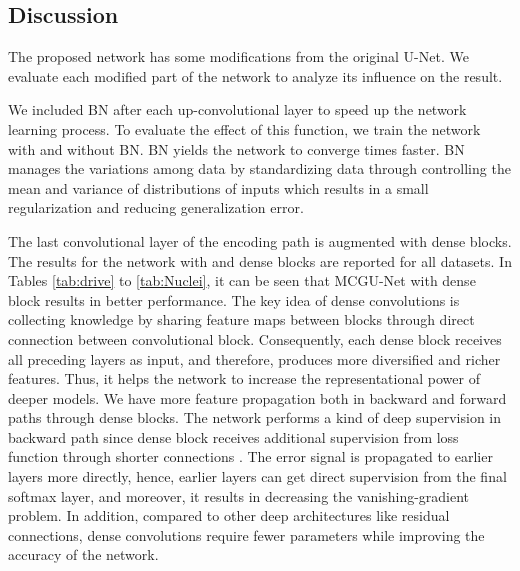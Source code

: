 \documentclass[journal]{IEEEtran}
\begin{document}
\subsection{Discussion}
The proposed network has some modifications from the original U-Net. We evaluate each modified part of the network to analyze its influence on the result.

We included BN after each up-convolutional layer to speed up the network learning process. To evaluate the effect of this function, we train the network with and without BN. BN yields the network to converge  times faster. BN manages the variations among data by standardizing data through controlling the mean and variance of distributions of inputs which results in a small regularization and reducing generalization error. 



The last convolutional layer of the encoding path is augmented with dense blocks. The results for the network with  and  dense blocks are reported for all datasets. In Tables \ref{tab:drive} to \ref{tab:Nuclei}, it can be seen that MCGU-Net with  dense block results in better performance.
The key idea of dense convolutions is collecting knowledge by sharing feature maps between blocks through direct connection between convolutional block. Consequently, each dense block receives all preceding layers as input, and therefore, produces more diversified and richer features. Thus, it helps the network to increase the representational power of deeper models.
We have more feature propagation both in backward and forward paths through dense blocks. The network performs a kind of deep supervision in backward path since dense block receives additional supervision from loss function through shorter connections \cite{huang2017densely}. The error signal is propagated to earlier layers more directly, hence, earlier layers can get direct supervision from the final softmax layer, and moreover, it results in decreasing the vanishing-gradient problem. 
In addition, compared to other deep architectures like residual connections, dense convolutions require fewer parameters while improving the accuracy of the network.
\end{document}
